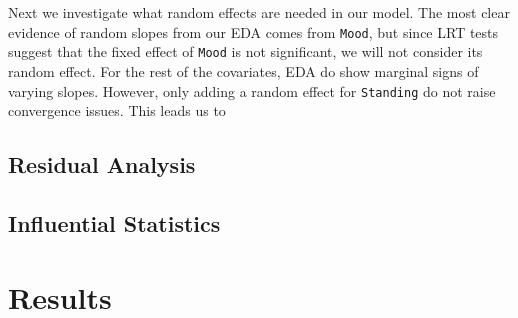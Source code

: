 \documentclass[12pt,twoside,letterpaper]{article}
\theoremstyle{definition}
\theoremstyle{definition}
\begin{document}
Next we investigate what random effects are needed in our model. The most clear evidence of random slopes from our EDA comes from \texttt{Mood}, but since LRT tests suggest that the fixed effect of \texttt{Mood} is not significant, we will not consider its random effect. For the rest of the covariates, EDA do show marginal signs of varying slopes. However, only adding a random effect for \texttt{Standing} do not raise convergence issues. This leads us to 

\subsection{Residual Analysis}\label{sec: resid}

\subsection{Influential Statistics}\label{sec: infl stat}

\section{Results}\label{sec: results}
\end{document}
